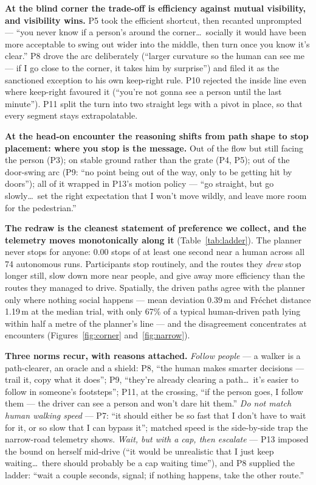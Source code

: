 \textbf{At the blind corner the trade-off is efficiency against mutual
visibility, and visibility wins.} P5 took the efficient shortcut, then
recanted unprompted --- ``you never know if a person's around the
corner\dots\ socially it would have been more acceptable to swing out
wider into the middle, then turn once you know it's clear.'' P8 drove
the arc deliberately (``larger curvature so the human can see me --- if
I go close to the corner, it takes him by surprise'') and filed it as
the sanctioned exception to his own keep-right rule. P10 rejected the
inside line even where keep-right favoured it (``you're not gonna see a
person until the last minute''). P11 split the turn into two straight
legs with a pivot in place, so that every segment stays extrapolatable.

\textbf{At the head-on encounter the reasoning shifts from path shape
to stop placement: where you stop is the message.} Out of the flow but
still facing the person (P3); on stable ground rather than the grate
(P4, P5); out of the door-swing arc (P9: ``no point being out of the
way, only to be getting hit by doors''); all of it wrapped in P13's
motion policy --- ``go straight, but go slowly\dots\ set the right
expectation that I won't move wildly, and leave more room for the
pedestrian.''

\textbf{The redraw is the cleanest statement of preference we collect,
and the telemetry moves monotonically along it}
(Table~\ref{tab:ladder}). The planner never stops for anyone: 0.00
stops of at least one second near a human across all 74 autonomous
runs. Participants stop routinely, and the routes they \emph{drew}
stop longer still, slow down more near people, and give away more
efficiency than the routes they managed to drive. Spatially, the driven
paths agree with the planner only where nothing social happens ---
mean deviation 0.39\,m and Fr\'{e}chet distance 1.19\,m at the median
trial, with only 67\% of a typical human-driven path lying within half
a metre of the planner's line --- and the disagreement concentrates at
encounters (Figures~\ref{fig:corner} and~\ref{fig:narrow}).

\textbf{Three norms recur, with reasons attached.} \emph{Follow
people} --- a walker is a path-clearer, an oracle and a shield: P8,
``the human makes smarter decisions --- trail it, copy what it does'';
P9, ``they're already clearing a path\dots\ it's easier to follow in
someone's footsteps''; P11, at the crossing, ``if the person goes, I
follow them --- the driver can see a person and won't dare hit them.''
\emph{Do not match human walking speed} --- P7: ``it should either be
so fast that I don't have to wait for it, or so slow that I can bypass
it''; matched speed is the side-by-side trap the narrow-road telemetry
shows. \emph{Wait, but with a cap, then escalate} --- P13 imposed the
bound on herself mid-drive (``it would be unrealistic that I just keep
waiting\dots\ there should probably be a cap waiting time''), and P8
supplied the ladder: ``wait a couple seconds, signal; if nothing
happens, take the other route.''

